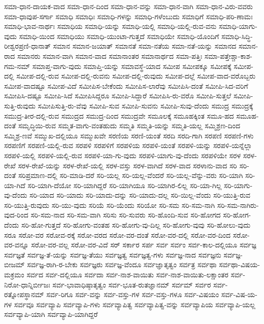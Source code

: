 {ಸಮಾ-ಧಾನ-ದಾಯಕ-ವಾದ
ಸಮಾ-ಧಾನ-ದಿಂದ
ಸಮಾ-ಧಾನ-ವನ್ನು
ಸಮಾ-ಧಾನ-ವಾಗಿ
ಸಮಾ-ಧಾನ-ವಿರು-ವವರು
ಸಮಾ-ಧಾವುಪ-ಸರ್ಗಾ
ಸಮಾಧಿ
ಸಮಾಧಿಃ
ಸಮಾಧಿ-ಗಳನ್ನು
ಸಮಾಧಿ-ಗಳೆಂಬುದು
ಸಮಾಧಿಗೆ
ಸಮಾಧಿ-ಪರಿ-ಣಾಮಃ
ಸಮಾಧಿ-ಭಾವ-ನಾರ್ಥಃ
ಸಮಾಧಿಯ
ಸಮಾಧಿ-ಯನ್ನು
ಸಮಾಧಿ-ಯಲ್ಲಿ
ಸಮಾಧಿ-ಯಲ್ಲಿ-ರುವ-ವನು
ಸಮಾಧಿ-ಯಾಗು-ವುದು
ಸಮಾಧಿ-ಯಿಂದ
ಸಮಾಧಿಯು
ಸಮಾಧಿ-ಯುಂಟಾ-ಗುತ್ತದೆ
ಸಮಾಧಿಯೇ
ಸಮಾಧಿ-ಯೊಂದಿಗೆ
ಸಮಾಧಿ-ಸಿದ್ಧಿ-ರೀಶ್ವರಪ್ರಣಿ-ಧಾನಾತ್
ಸಮಾನ
ಸಮಾನ-ಜಯಾತ್
ಸಮಾನತೆ
ಸಮಾ-ನತೆಯ
ಸಮಾ-ನತೆ-ಯನ್ನು
ಸಮಾನದ
ಸಮಾನ-ರಾದ
ಸಮಾನರು
ಸಮಾನ-ವಾಗಿ
ಸಮಾನ-ವಾದ
ಸಮಾನಾಂತರ
ಸಮಾನಾರ್ಥದ
ಸಮಾ-ಪತ್ತಿಃ
ಸಮಾ-ಪತ್ತೇಶ್ಚಾ-ಕಾಶ-ಗಮ-ನಮ್
ಸಮಾಪ್ತ-ವಾಗು-ವುದು
ಸಮಾಪ್ತಿ-ಯನ್ನು
ಸಮಾವಸ್ಥೆ-ಯಾದ
ಸಮೀಪ
ಸಮೀಪಕ್ಕೂ
ಸಮೀಪಕ್ಕೆ
ಸಮೀಪ-ದಲ್ಲಿ
ಸಮೀಪ-ದಲ್ಲಿ-ರುವ
ಸಮೀಪ-ದಲ್ಲಿ-ರುವನು
ಸಮೀಪ-ದಲ್ಲಿ-ರುವುದು
ಸಮೀಪ-ದಲ್ಲೆ
ಸಮೀಪ-ವಾದ-ವರೊಬ್ಬರು
ಸಮೀಪ-ವಾದಷ್ಟೂ
ಸಮೀಪ-ವಿದೆ
ಸಮೀಪಿಸ-ಬೇಕೆಂದು
ಸಮೀಪಿಸ-ಲಾರೆವು
ಸಮೀಪಿಸಿ-ದಂತೆ
ಸಮೀಪಿ-ಸಿದ-ವರಿಗೆ
ಸಮೀಪಿಸಿ-ದಷ್ಟೂ
ಸಮೀಪಿ-ಸಿದೆ
ಸಮೀಪಿಸಿದ್ದರೂ
ಸಮೀಪಿ-ಸಿದ್ದಾರೆ
ಸಮೀಪಿಸಿ-ರು-ವರೊ
ಸಮೀಪಿ-ಸುತ್ತಲೆ
ಸಮೀಪಿ-ಸುತ್ತಿ-ರುವುದು
ಸಮೀಪಿಸುತ್ತಿ-ರು-ವೆವು
ಸಮೀಪಿ-ಸುವ
ಸಮೀಪಿ-ಸುವನು
ಸಮೀಪಿ-ಸುವು-ದೆಂದು
ಸಮುದ್ರ
ಸಮುದ್ರಕ್ಕೆ
ಸಮುದ್ರ-ತೀರ-ದಲ್ಲಿ-ರುವ
ಸಮುದ್ರದ
ಸಮುದ್ರ-ದಿಂದ
ಸಮುದ್ರವೇ
ಸಮೂಲಕ್ಕೆ
ಸಮೂಹಕ್ಕಿಂತ
ಸಮೂ-ಹದ
ಸಮೂಹ-ದಂತೆ
ಸಮೃದ್ಧಿಯಿ-ರುವ
ಸಮ್ಮತ-ವಾಗು-ವಂತಹುದು
ಸಮ್ಮತಿ
ಸಮ್ಮತಿ-ಯನ್ನು
ಸಮ್ಮತಿ-ಯಲ್ಲ
ಸಮ್ಮಿಶ್ರಣ-ದಿಂದ
ಸಮ್ಮಿಶ್ರ-ಣವೆ
ಸಮ್ಮುಖ-ದಲ್ಲಿಯೂ
ಸಮ್ಮುಖವೇ
ಸರಣಿಯ
ಸರಣಿ-ಯಂತೆ
ಸರದಿ
ಸರದಿ-ಗಾಗಿ
ಸರಪಣಿ
ಸರಪಣಿ-ಗಳು
ಸರಪಣಿಗೆ
ಸರಪಣಿ-ಯಲ್ಲಿ-ರುವ
ಸರಪಳಿ
ಸರಪಳಿಗೆ
ಸರಪಳಿಯ
ಸರಪಳಿ-ಯಂತೆ
ಸರಪಳಿ-ಯನ್ನು
ಸರಪಳಿ-ಯನ್ನೆಲ್ಲಾ
ಸರಪಳಿ-ಯಲ್ಲಿ
ಸರಪಳಿ-ಯಲ್ಲಿ-ರುವ
ಸರಪಳಿ-ಯಾ-ಗು-ವುದು
ಸರಪಳಿ-ಯಾಗು-ವು-ದೆಂದು
ಸರಪಳಿಯೇ
ಸರಳ
ಸರಳ-ರೇಖೆ
ಸರಳ-ರೇಖೆ-ಯನ್ನು
ಸರಳ-ರೇಖೆ-ಯಲ್ಲಿ
ಸರಳ-ವಸ್ತು
ಸರಳ-ವಾಗಿದೆ
ಸರಳ-ವಾದ
ಸರಳಾನು-ವಾದ
ಸರಿ
ಸರಿ-ದಂತೆ
ಸರಿಪ್ರಮಾಣ-ದಲ್ಲಿ
ಸರಿ-ಮಾಡಿ-ದರೆ
ಸರಿ-ಯಲ್ಲ
ಸರಿ-ಯಲ್ಲ-ವೆಂದರೆ
ಸರಿ-ಯಲ್ಲ-ವೆನ್ನು-ವರು
ಸರಿ-ಯಾಗಿ
ಸರಿ-ಯಾ-ಗಿದೆ
ಸರಿ-ಯಾಗಿ-ದೆಯೋ
ಸರಿ-ಯಾಗಿದ್ದರೆ
ಸರಿ-ಯಾಗಿಯೂ
ಸರಿ-ಯಾಗಿರ-ಲಿಲ್ಲ
ಸರಿ-ಯಾ-ಗಿಲ್ಲ
ಸರಿ-ಯಾಗು-ವು-ದೆಂದು
ಸರಿ-ಯಾದ
ಸರಿ-ಯಾದು
ಸರಿ-ಯಾದು-ದನ್ನು
ಸರಿ-ಯಾದು-ದಲ್ಲ
ಸರಿ-ಯಿಲ್ಲ-ವೆಂದು
ಸರಿ-ಯುತ್ತಿ-ರುವ
ಸರಿ-ಯುತ್ತಿ-ರುವುದು
ಸರಿ-ಯು-ವುದು
ಸರಿಯೆ
ಸರಿ-ಯೆಂದು
ಸರಿಯೋ
ಸರಿ-ಸಮ
ಸರಿ-ಸಮ-ನಾಗಿ
ಸರಿ-ಸಮ-ನಾಗಿರು-ವುದ-ರಿಂದ
ಸರಿ-ಸಮ-ನಾದ
ಸರಿ-ಸಮ-ವಾಗಿ
ಸರಿಸು
ಸರಿ-ಸುವರು
ಸರಿ-ಹೊಂದಿ-ಸುವ
ಸರಿ-ಹೋಗದ
ಸರಿ-ಹೋಗ-ದೆಂದು
ಸರಿ-ಹೋ-ಗುತ್ತದೆ
ಸರಿ-ಹೋಗು-ವಂತಹ
ಸರಿ-ಹೋಗು-ವು-ದಿಲ್ಲ
ಸರಿ-ಹೋಗು-ವುವು
ಸರಿ-ಹೋಲು-ವುದು
ಸರೂ
ಸರೋ-ವರ
ಸರೋವ-ರಕ್ಕೆ
ಸರೋ-ವರದ
ಸರೋ-ವರ-ದಂತೆ
ಸರೋ-ವರ-ದಲ್ಲಿ
ಸರೋ-ವರ-ದಿಂದ
ಸರೋ-ವರ-ವನ್ನೂ
ಸರೋ-ವರ-ವಲ್ಲ
ಸರೋ-ವರ-ವಿದೆ
ಸರ್
ಸರ್ಕಾರ
ಸರ್ಪ
ಸರ್ವ
ಸರ್ವಂ
ಸರ್ವ-ಕಾಲ-ದಲ್ಲಿಯೂ
ಸರ್ವಜ್ಞ
ಸರ್ವಜ್ಞತೆ
ಸರ್ವಜ್ಞ-ತೆ-ಯನ್ನು
ಸರ್ವಜ್ಞ-ತೆಯು
ಸರ್ವಜ್ಞತ್ವ
ಸರ್ವಜ್ಞತ್ವ-ಗಳು
ಸರ್ವಜ್ಞ-ನಾದ
ಸರ್ವಜ್ಞನು
ಸರ್ವಜ್ಞ-ಬೀಜಮ್
ಸರ್ವಜ್ಞ-ರಾಗಿ-ರ-ಬೇಕು
ಸರ್ವಜ್ಞರು
ಸರ್ವಜ್ಞ-ವೆಂದೂ
ಸರ್ವಜ್ಞಾತೃತ್ವಂ
ಸರ್ವತ್ರ
ಸರ್ವಥಾ
ಸರ್ವಥಾ-ವಿಷಯ-ಮಕ್ರಮಂ
ಸರ್ವದ
ಸರ್ವ-ದಲ್ಲಿಯೂ
ಸರ್ವದಾ
ಸರ್ವ-ನಾಶ-ವಾಯಿತು
ಸರ್ವ-ನಾಶ-ವಾಯಿತು-ಲಕ್ಷಾಂತರ
ಸರ್ವ-ನಿರೋ-ಧಾನ್ನಿರ್ಬೀಜಃ
ಸರ್ವ-ಭಾವಾಧಿಷ್ಠಾತೃತ್ವಂ
ಸರ್ವ-ಭೂತ-ರುತಜ್ಞಾನಮ್
ಸರ್ವಮ್
ಸರ್ವರ
ಸರ್ವ-ರತ್ನೋಪಸ್ಥಾನಮ್
ಸರ್ವ-ರಿಗೂ
ಸರ್ವ-ವನ್ನು
ಸರ್ವ-ವಸ್ತು-ಗಳ
ಸರ್ವ-ವಸ್ತು-ಗಳೂ
ಸರ್ವ-ವಿಷಯಂ
ಸರ್ವ-ವಿಷ-ಯ-ಗಳ
ಸರ್ವವೂ
ಸರ್ವವ್ಯಾಪಿ
ಸರ್ವವ್ಯಾಪಿ-ಗಳು
ಸರ್ವವ್ಯಾಪಿತ್ವ
ಸರ್ವವ್ಯಾಪಿತ್ವ-ವನ್ನು
ಸರ್ವವ್ಯಾಪಿಯ
ಸರ್ವವ್ಯಾಪಿ-ಯಲ್ಲ
ಸರ್ವವ್ಯಾಪಿ-ಯಾಗಿ
ಸರ್ವವ್ಯಾಪಿ-ಯಾಗಿದ್ದರೆ
}
